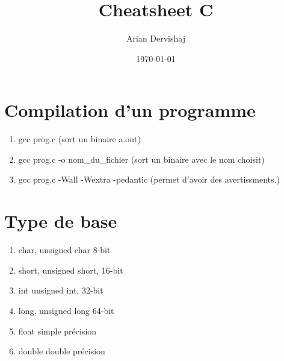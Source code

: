 \documentclass[a4paper, 12pt]{article}
\title{Cheatsheet C}
\author{Arian Dervishaj}
\date{\today}
\begin{document}
\maketitle
\pagebreak

\section{Compilation d'un programme}
\begin{enumerate}
    \item gcc prog.c (sort un binaire a.out)
    \item gcc prog.c -o nom\_du\_fichier (sort un binaire avec le nom choisit)
    \item gcc prog.c -Wall -Wextra -pedantic (permet d'avoir des avertissments.)
\end{enumerate}

\section{Type de base}
\begin{enumerate}
    \item char, unsigned char         8-bit
    \item short, unsigned short,      16-bit
    \item int unsigned int,           32-bit
    \item long, unsigned long         64-bit
    \item float                       simple précision
    \item double                      double précision

\end{enumerate}
\end{document}
